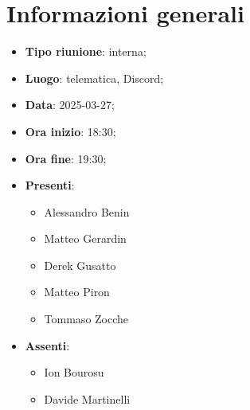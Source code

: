 \section{Informazioni generali}
\begin{itemize}
  \item \textbf{Tipo riunione}: interna;
  \item \textbf{Luogo}: telematica, Discord;
  \item \textbf{Data}: 2025-03-27;
  \item \textbf{Ora inizio}: 18:30;
  \item \textbf{Ora fine}: 19:30;
  
  \item \textbf{Presenti}:
  \begin{itemize}
    \item Alessandro Benin
    \item Matteo Gerardin
    \item Derek Gusatto
    \item Matteo Piron
    \item Tommaso Zocche
  \end{itemize}

  \item \textbf{Assenti}:
  \begin{itemize}
    \item Ion Bourosu
    \item Davide Martinelli
  \end{itemize}
 
\end{itemize}